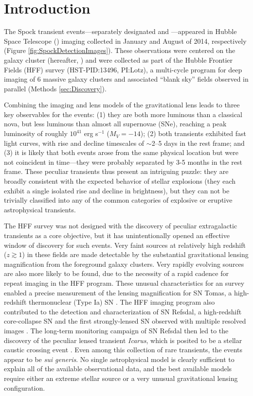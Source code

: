 \section{Introduction}\label{sec:Introduction}

The Spock transient events---separately designated \spockone and
\spocktwo---appeared in Hubble Space Telescope (\HST) imaging
collected in January and August of 2014, respectively (Figure
\ref{fig:SpockDetectionImages}).  These observations were centered on
the galaxy cluster  (hereafter, ) and were collected
as part of the Hubble Frontier Fields (HFF) survey (HST-PID:13496,
PI:Lotz), a multi-cycle program for deep imaging of 6 massive galaxy
clusters and associated ``blank sky'' fields observed in parallel
(Methods \ref{sec:Discovery}).

Combining the \HST imaging and lens models of the  gravitational
lens leads to three key observables for the \spock events: (1) they are
both more luminous than a classical nova, but less luminous than
almost all supernovae (SNe), reaching a peak luminosity of roughly
$10^{41}$ erg s$^{-1}$ ($M_V=−14$); (2) both transients exhibited fast
light curves, with rise and decline timescales of $\sim$2--5 days in
the rest frame; and (3) it is likely that both events arose from the
same physical location but were not coincident in time---they were
probably separated by 3-5 months in the rest frame. These peculiar
transients thus present an intriguing puzzle: they are broadly
consistent with the expected behavior of stellar explosions (they each
exhibit a single isolated rise and decline in brightness), but they
can not be trivially classified into any of the common categories of
explosive or eruptive astrophysical transients.  

The HFF survey was not designed with the discovery of peculiar
extragalactic transients as a core objective, but it has
unintentionally opened an effective window of discovery for such
events.  Very faint sources at relatively high redshift ($z\gtrsim1$)
in these fields are made detectable by the substantial gravitational
lensing magnification from the foreground galaxy clusters.  Very
rapidly evolving sources are also more likely to be found, due to the
necessity of a rapid cadence for repeat imaging in the HFF program.
These unusual characteristics for an \HST survey enabled a precise
measurement of the lensing magnification for SN Tomas, a high-redshift
thermonuclear (Type Ia) SN \citep{Rodney:2015a}.  The HFF imaging
program also contributed to the detection and characterization of SN
Refsdal, a high-redshift core-collapse SN and the first
strongly-lensed SN observed with multiple resolved images
\citep{Kelly:2015a}.  The long-term monitoring campaign of SN Refsdal
then led to the discovery of the peculiar lensed transient {\it
  Icarus}, which is posited to be a stellar caustic crossing event
\citep{Kelly:2016}.  Even among this collection of rare transients,
the \spock events appear to be {\it sui generis}.  No single
astrophysical model is clearly sufficient to explain all of the
available observational data, and the best available models require
either an extreme stellar source or a very unusual gravitational
lensing configuration.

